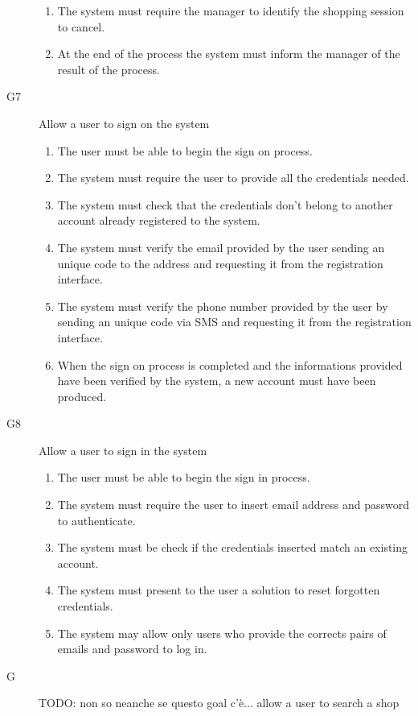 \begin{description}
\begin{enumerate}[resume*]
            \item The system must require the manager to identify the shopping session to cancel.
            \item At the end of the process the system must inform the manager of the result of the process.
        \end{enumerate}
    \item [G7] Allow a user to sign on the system
        \begin{enumerate}[resume*]
            \item The user must be able to begin the sign on process.
            \item The system must require the user to provide all the credentials needed.
            \item The system must check that the credentials don't belong to another account already registered to the system.
            \item The system must verify the email provided by the user sending an unique code to the address and requesting it from the registration interface.
            \item The system must verify the phone number provided by the user by sending an unique code via SMS and requesting it from the registration interface.
            \item When the sign on process is completed and the informations provided have been verified by the system, a new account must have been produced.
        \end{enumerate}
    \item [G8] Allow a user to sign in the system
        \begin{enumerate}[resume*]
            \item The user must be able to begin the sign in process.
            \item The system must require the user to insert email address and password to authenticate.
            \item The system must be check if the credentials inserted match an existing account.
            \item The system must present to the user a solution to reset forgotten credentials.
            \item The system may allow only users who provide the corrects pairs of emails and password to log in.
        \end{enumerate}
    \item [G] TODO: non so neanche se questo goal c'è... allow a user to search a shop

\end{description}
